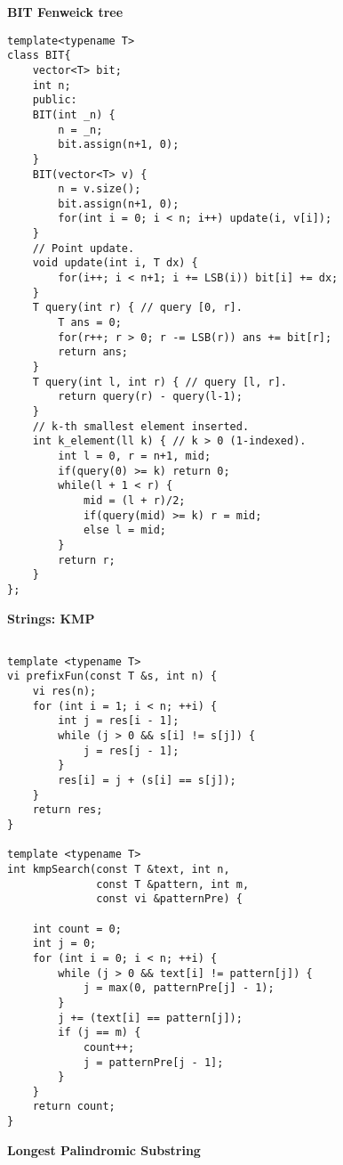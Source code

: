 \documentclass[a4paper,10pt]{article}
\newcommand{\titleAlg}[1]{\vspace{-10pt}
\begin{center}\textbf{#1}\end{center} \vspace{-10pt}}
\begin{document}
\vspace{-15pt}
\titleAlg{BIT Fenweick tree}
\vspace{-5pt}
\begin{multicols}{2}
\begin{verbatim}
template<typename T>
class BIT{
    vector<T> bit;
    int n;
    public:
    BIT(int _n) {
        n = _n;
        bit.assign(n+1, 0);
    }
    BIT(vector<T> v) {
        n = v.size();
        bit.assign(n+1, 0);
        for(int i = 0; i < n; i++) update(i, v[i]);
    }
    // Point update.
    void update(int i, T dx) {
        for(i++; i < n+1; i += LSB(i)) bit[i] += dx;
    }
    T query(int r) { // query [0, r].
        T ans = 0;
        for(r++; r > 0; r -= LSB(r)) ans += bit[r];
        return ans;
    }
    T query(int l, int r) { // query [l, r].
        return query(r) - query(l-1);
    }
    // k-th smallest element inserted.
    int k_element(ll k) { // k > 0 (1-indexed).
        int l = 0, r = n+1, mid;
        if(query(0) >= k) return 0;
        while(l + 1 < r) {
            mid = (l + r)/2;
            if(query(mid) >= k) r = mid;
            else l = mid;
        }
        return r;
    }
};
\end{verbatim}
\end{multicols}
\titleAlg{{\Large Strings:  }KMP}
\begin{multicols}{2}
\begin{verbatim}

template <typename T> 
vi prefixFun(const T &s, int n) {
    vi res(n);
    for (int i = 1; i < n; ++i) {
        int j = res[i - 1];
        while (j > 0 && s[i] != s[j]) {
            j = res[j - 1];
        }
        res[i] = j + (s[i] == s[j]);
    }
    return res;
}

template <typename T>
int kmpSearch(const T &text, int n, 
              const T &pattern, int m, 
              const vi &patternPre) {

    int count = 0;
    int j = 0;
    for (int i = 0; i < n; ++i) {
        while (j > 0 && text[i] != pattern[j]) {
            j = max(0, patternPre[j] - 1);
        }
        j += (text[i] == pattern[j]);
        if (j == m) {
            count++;
            j = patternPre[j - 1];
        }
    }
    return count;
}
\end{verbatim}
\end{multicols}
\titleAlg{Longest Palindromic Substring}
\end{document}
